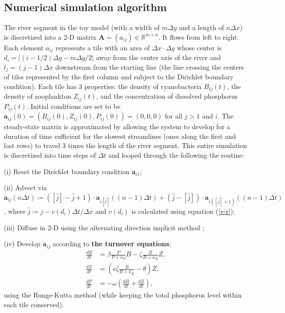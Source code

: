 \documentclass{article}
\renewcommand\vec{\mathbf}
\begin{document}
\subsection*{Numerical simulation algorithm}

The river segment in the toy model (with a width of $m\Delta y$ and a length of $n\Delta x$) is discretized into a 2-D matrix $\vec{A} = (a_{ij}) \in \mathbb{R}^{m \times n}$. It flows from left to right. Each element $a_{ij}$ represents a tile with an area of $\Delta x \cdot \Delta y$ whose center is $d_i = |(i - 1/2)\Delta y - m\Delta y/2|$ away from the center axis of the river and $l_j = (j - 1)\Delta x$ downstream from the starting line (the line crossing the centers of tiles represented by the first column and subject to the Dirichlet boundary condition). Each tile has 3 properties: the density of cyanobacteria $B_{ij}(t)$, the density of zooplankton $Z_{ij}(t)$, and the concentration of dissolved phosphorus $P_{ij}(t)$. Initial conditions are set to be $\vec{a}_{ij}(0) = (B_{ij}(0), Z_{ij}(0), P_{ij}(0)) = (0, 0, 0)$ for all $j > 1$ and $i$. The steady-state matrix is approximated by allowing the system to develop for a duration of time sufficient for the slowest streamlines (ones along the first and last rows) to travel 3 times the length of the river segment. This entire simulation is discretized into time steps of $\Delta t$ and looped through the following the routine:

(i) Reset the Dirichlet boundary condition $\vec{a}_{i1}$;

(ii) Advect via $\vec{a}_{ij}(n\Delta t) \coloneqq ([\hat{j}] - \hat{j} + 1) \cdot \vec{a}_{i[\hat{j}]}((n - 1)\Delta t) + (\hat{j} - [\hat{j}]) \cdot \vec{a}_{i([\hat{j}] + 1)}((n - 1)\Delta t)$, where $\hat{j} \coloneqq j - v(d_i)\Delta t/\Delta x$ and $v(d_i)$ is calculated using equation (\ref{v-r});

(iii) Diffuse in 2-D using the alternating direction implicit method \cite{ADI};

(iv) Develop $\vec{a}_{ij}$ according to \textbf{the turnover equations}:
\begin{align*}
    \frac{d B}{d t} &= \beta\frac{P}{P + \kappa_P}B - \zeta\frac{B}{B + \kappa_B}Z,\\
    \frac{d Z}{d t} &= (\epsilon\zeta\frac{B}{B + \kappa_B} - \theta) Z,\\
    \frac{d P}{d t} &= -\omega(\frac{d B}{d t} + \frac{d Z}{d t}),
\end{align*}
using the Runge-Kutta method (while keeping the total phosphorus level within each tile conserved).
\end{document}
